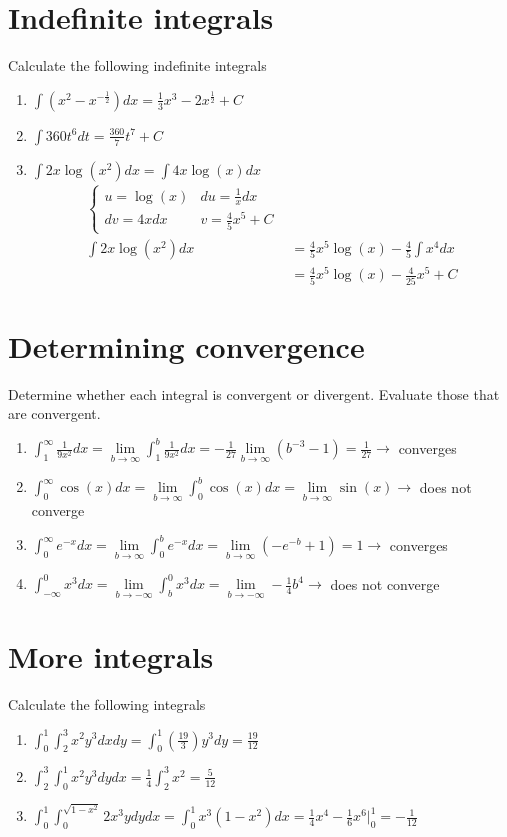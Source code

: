 \documentclass[12pt]{article}
\begin{document}
\section{Indefinite integrals}
Calculate the following indefinite integrals
\begin{enumerate}
    \item $\int (x^2 - x^{-\frac{1}{2}})dx = \frac{1}{3}x^3 -2x^{\frac{1}{2}}+C$
    \item $\int 360t^6dt = \frac{360}{7}t^7+C $
    \item $\int 2x \log(x^2) dx = \int 4x\log(x)dx$
    \begin{align*}
        \begin{cases}
            u=\log(x) & du = \frac{1}{x}dx
            \\ dv = 4xdx & v =\frac{4}{5}x^5+C
        \end{cases}
        \\ \int 2x \log(x^2) dx &= \frac{4}{5}x^5 \log(x) - \frac{4}{5}\int x^4 dx
        \\ &=  \frac{4}{5}x^5 \log(x) - \frac{4}{25}x^5+C
    \end{align*}
\end{enumerate}

\section{Determining convergence}
Determine whether each integral is convergent or divergent. Evaluate those that are convergent.
\begin{enumerate}
    \item $\int_1^\infty \frac{1}{9x^2}dx = \lim\limits_{b \to \infty} \int_1^b \frac{1}{9x^2}dx = -\frac{1}{27}\lim\limits_{b \to \infty} (b^{-3}-1) = \frac{1}{27} \to $ converges
    \item $\int_0^\infty \cos(x)dx = \lim\limits_{b \to \infty}\int_0^b \cos(x)dx =\lim\limits_{b \to \infty} \sin(x) \to $ does not converge
    \item $\int_0^\infty e^{-x}dx = \lim\limits_{b \to \infty}\int_0^b e^{-x}dx=   \lim\limits_{b \to \infty} (-e^{-b}+1)=1 \to $ converges
    \item $\int_{-\infty}^0 x^3 dx = \lim\limits_{b \to -\infty}\int_{b}^0 x^3 dx = \lim\limits_{b \to -\infty} -\frac{1}{4}b^4 \to$ does not converge
\end{enumerate}

\section{More integrals}
Calculate the following integrals
\begin{enumerate}
    \item $\int_0^1 \int_2^3 x^2 y^3 dxdy = \int_0^1 \left(\frac{19}{3}\right)y^3 dy = \frac{19}{12}$
    \item $\int_2^3 \int_0^1 x^2y^3 dydx = \frac{1}{4} \int_2^3 x^2 = \frac{5}{12}$
    \item $\int_0^1 \int_0^{\sqrt{1-x^2}}2x^3y dydx = \int_0^1 x^3(1-x^2)dx= \frac{1}{4}x^4- \frac{1}{6}x^6\bigg|_0^1 = -\frac{1}{12}$
\end{enumerate}
\end{document}
